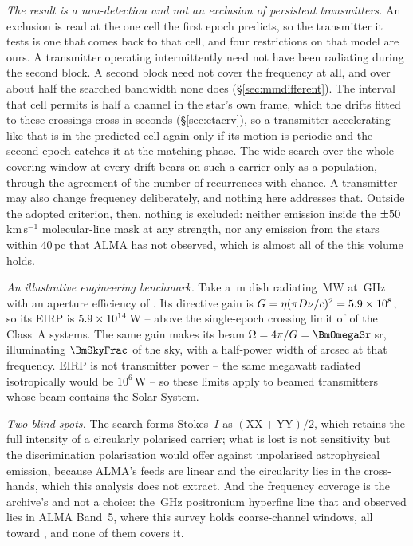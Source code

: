 \noindent\emph{The result is a non-detection and not an exclusion of
persistent transmitters.} An exclusion is read at the one cell the first
epoch predicts, so the transmitter it tests is one that comes back to that
cell, and four restrictions on that model are
ours. A transmitter operating intermittently need not have been radiating
during the second block. A second block need not cover the frequency at all,
and over about half the searched bandwidth none does
(\S\ref{sec:mmdifferent}). The interval that cell permits is half a channel in the star's own frame,
which the drifts fitted to these crossings cross in seconds
(\S\ref{sec:etacrv}), so a transmitter accelerating like that is in the
predicted cell again only if its motion is periodic and the second epoch
catches it at the matching phase. The wide search over the whole covering
window at every drift bears on such a carrier only as a population, through
the agreement of the number of recurrences with chance. A transmitter may also change frequency deliberately,
and nothing here addresses that. Outside the adopted criterion, then, nothing
is excluded: neither emission inside the
$\pm50$\,km\,s$^{-1}$ molecular-line mask at any strength, nor any
emission from the stars within 40\,pc that ALMA has not
observed, which is almost all of the \NGaiaCensus{} this volume holds.

\noindent\emph{An illustrative engineering benchmark.} Take a \BenchDiam\,m dish radiating \BenchPowerMW\,MW at
\BenchFreqGHz\,GHz with an aperture efficiency of \BenchEta. Its directive
gain is $G=\eta(\pi D\nu/c)^{2}=5.9\times10^{8}$, so its EIRP is
$5.9\times10^{14}$\,W -- above the single-epoch crossing limit of \BenchNSysA{} of the
\NSysClassA{} Class~A systems. The same gain makes its beam
$\Omega=4\pi/G=\BmOmegaSr$\,sr, illuminating $\BmSkyFrac$ of the sky, with a
half-power width of \BmArcsec{} arcsec at that frequency. EIRP is not transmitter power -- the same megawatt
radiated isotropically would be $10^{6}$\,W -- so these limits apply to
beamed transmitters whose beam contains the Solar System.

\noindent\emph{Two blind spots.} The search forms Stokes~$I$ as
$(\mathrm{XX}+\mathrm{YY})/2$, which retains the full intensity of a circularly polarised
carrier; what is lost is not sensitivity but the discrimination polarisation
would offer against unpolarised astrophysical emission, because ALMA's feeds
are linear and the circularity lies in the cross-hands, which this analysis
does not extract. And the frequency coverage is the archive's and not a
choice: the \SbPriorFreqGHz\,GHz positronium hyperfine line that
\citet{Steffes1994} and \citet{Mauersberger1996} observed lies in ALMA Band~5,
where this survey holds
\LnBFiveWin{} coarse-channel windows, all toward \LnBFiveStars, and none of
them covers it.

